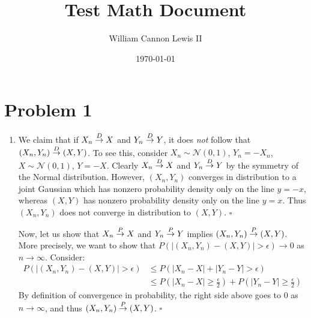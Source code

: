\documentclass{article}
\title{Test Math Document}
\author{William Cannon Lewis II}
\date{\today}
\begin{document}
\onehalfspacing

\maketitle

\section*{Problem 1}
\begin{enumerate}[label=(\alph*)]
\item We claim that if $X_n \overset{D}{\to} X$ and $Y_n \overset{D}{\to} Y$, it does \emph{not} follow that $(X_n, Y_n) \overset{D}{\to} (X,Y)$. To see this, consider $X_n \sim \mathcal{N}(0,1)$, $Y_n = -X_n$, $X \sim \mathcal{N}(0,1)$, $Y = -X$. Clearly $X_n \overset{D}{\to} X$ and $Y_n \overset{D}{\to} Y$ by the symmetry of the Normal distribution. However, $(X_n, Y_n)$ converges in distribution to a joint Gaussian which has nonzero probability density only on the line $y = -x$, whereas $(X,Y)$ has nonzero probability density only on the line $y = x$. Thus $(X_n,Y_n)$ does not converge in distribution to $(X,Y)$. $\square$ 

Now, let us show that $X_n \overset{P}{\to} X$ and $Y_n \overset{P}{\to} Y$ implies $(X_n, Y_n) \overset{P}{\to} (X,Y)$. More precisely, we want to show that $P(|(X_n,Y_n) - (X,Y)| > \epsilon) \to 0$ as $n \to \infty$. Consider:
\begin{align*}
    P(|(X_n,Y_n) - (X,Y)| > \epsilon) &\leq P(|X_n - X| + |Y_n - Y| > \epsilon) \\
    &\leq P(|X_n - X| \geq \frac{\epsilon}{2}) + P(|Y_n - Y| \geq \frac{\epsilon}{2}) 
\end{align*}
By definition of convergence in probability, the right side above goes to 0 as $n \to \infty$, and thus $(X_n,Y_n) \overset{P}{\to} (X,Y)$. $\square$
\end{enumerate}
\end{document}
